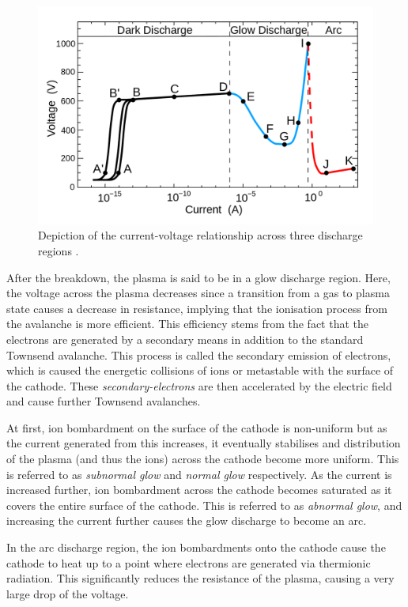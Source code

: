 \begin{figure}[h!]
	\centering
	\includegraphics[width=0.8\linewidth]{background/figures/dc_discharge.png}
	\caption{Depiction of the current-voltage relationship across three discharge regions \cite{Gallo1975}.}
	\label{fig:dc_discharge}
\end{figure}

After the breakdown, the plasma is said to be in a glow discharge region. Here, the voltage across the plasma decreases since a transition from a gas to plasma state causes a decrease in resistance, implying that the ionisation process from the avalanche is more efficient. This efficiency stems from the fact that the electrons are generated by a secondary means in addition to the standard Townsend avalanche. This process is called the secondary emission of electrons, which is caused the energetic collisions of ions or metastable with the surface of the cathode. These \textit{secondary-electrons} are then accelerated by the electric field and cause further Townsend avalanches.

At first, ion bombardment on the surface of the cathode is non-uniform but as the current generated from this increases, it eventually stabilises and distribution of the plasma (and thus the ions) across the cathode become more uniform. This is referred to as \textit{subnormal glow} and \textit{normal glow} respectively. As the current is increased further, ion bombardment across the cathode becomes saturated as it covers the entire surface of the cathode. This is referred to as \textit{abnormal glow}, and increasing the current further causes the glow discharge to become an arc.

In the arc discharge region, the ion bombardments onto the cathode cause the cathode to heat up to a point where electrons are generated via thermionic radiation. This significantly reduces the resistance of the plasma, causing a very large drop of the voltage. 

